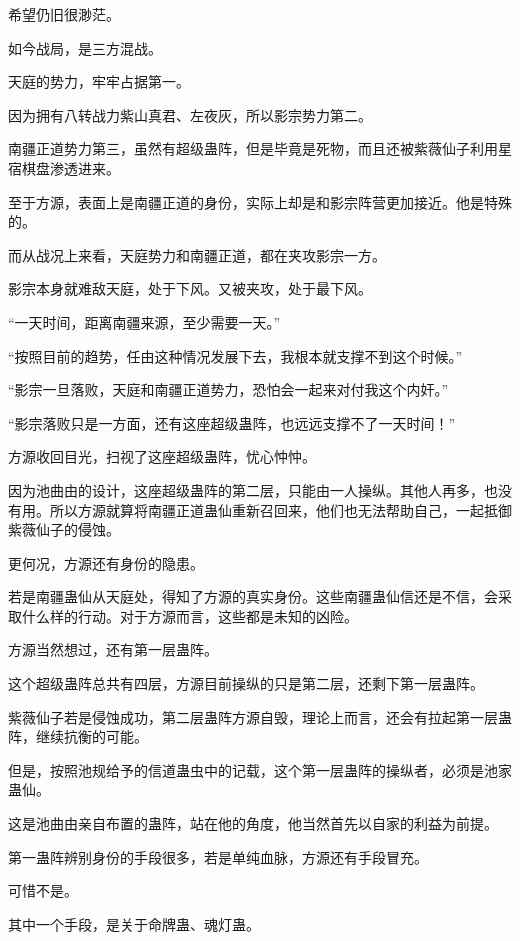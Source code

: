 
\begin{this_body}

希望仍旧很渺茫。

如今战局，是三方混战。

天庭的势力，牢牢占据第一。

因为拥有八转战力紫山真君、左夜灰，所以影宗势力第二。

南疆正道势力第三，虽然有超级蛊阵，但是毕竟是死物，而且还被紫薇仙子利用星宿棋盘渗透进来。

至于方源，表面上是南疆正道的身份，实际上却是和影宗阵营更加接近。他是特殊的。

而从战况上来看，天庭势力和南疆正道，都在夹攻影宗一方。

影宗本身就难敌天庭，处于下风。又被夹攻，处于最下风。

“一天时间，距离南疆来源，至少需要一天。”

“按照目前的趋势，任由这种情况发展下去，我根本就支撑不到这个时候。”

“影宗一旦落败，天庭和南疆正道势力，恐怕会一起来对付我这个内奸。”

“影宗落败只是一方面，还有这座超级蛊阵，也远远支撑不了一天时间！”

方源收回目光，扫视了这座超级蛊阵，忧心忡忡。

因为池曲由的设计，这座超级蛊阵的第二层，只能由一人操纵。其他人再多，也没有用。所以方源就算将南疆正道蛊仙重新召回来，他们也无法帮助自己，一起抵御紫薇仙子的侵蚀。

更何况，方源还有身份的隐患。

若是南疆蛊仙从天庭处，得知了方源的真实身份。这些南疆蛊仙信还是不信，会采取什么样的行动。对于方源而言，这些都是未知的凶险。

方源当然想过，还有第一层蛊阵。

这个超级蛊阵总共有四层，方源目前操纵的只是第二层，还剩下第一层蛊阵。

紫薇仙子若是侵蚀成功，第二层蛊阵方源自毁，理论上而言，还会有拉起第一层蛊阵，继续抗衡的可能。

但是，按照池规给予的信道蛊虫中的记载，这个第一层蛊阵的操纵者，必须是池家蛊仙。

这是池曲由亲自布置的蛊阵，站在他的角度，他当然首先以自家的利益为前提。

第一蛊阵辨别身份的手段很多，若是单纯血脉，方源还有手段冒充。

可惜不是。

其中一个手段，是关于命牌蛊、魂灯蛊。


\end{this_body}
